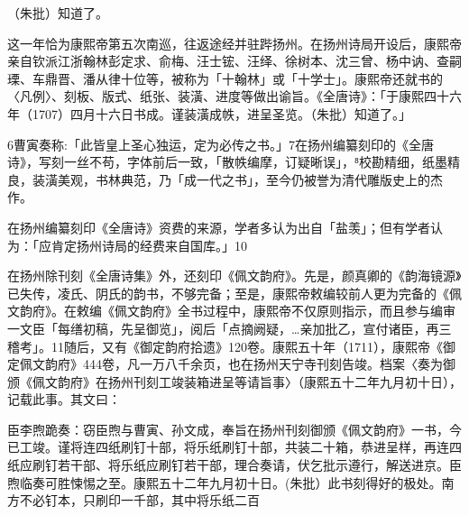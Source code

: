 \begin{BookQuote}
（朱批）知道了。
\end{BookQuote}

这一年恰为康熙帝第五次南巡，往返途经并驻跸扬州。在扬州诗局开设后，康熙帝亲自钦派江浙翰林彭定求、俞梅、汪士𬭎、汪绎、徐树本、沈三曾、杨中讷、查嗣瑮、车鼎晋、潘从律十位等，被称为「十翰林」或「十学士」。康熙帝还就书的〈凡例〉、刻板、版式、纸张、装潢、进度等做出谕旨。《全唐诗》：「于康熙四十六年（1707）四月十六日书成。谨装潢成帙，进呈圣览。（朱批）知道了。」

\vfill
\begin{BookNotes}
\end{BookNotes}

\noindent 6曹寅奏称:「此皆皇上圣心独运，定为必传之书。」7在扬州编纂刻印的《全唐诗》，写刻一丝不苟，字体前后一致，「散帙编摩，订疑晰误」，⁸校勘精细，纸墨精良，装潢美观，书林典范，乃「成一代之书」，至今仍被誉为清代雕版史上的杰作。

在扬州编纂刻印《全唐诗》资费的来源，学者多认为出自「盐羡」；但有学者认为：「应肯定扬州诗局的经费来自国库。」10

在扬州除刊刻《全唐诗集》外，还刻印《佩文韵府》。先是，颜真卿的《韵海镜源》已失传，凌氏、阴氏的韵书，不够完备；至是，康熙帝敕编较前人更为完备的《佩文韵府》。在敕编《佩文韵府》全书过程中，康熙帝不仅原则指示，而且参与编审一文臣「每缮初稿，先呈御览」，阅后「点摘阙疑，…亲加批乙，宣付诸臣，再三稽考」。11随后，又有《御定韵府拾遗》120卷。康熙五十年（1711），康熙帝《御定佩文韵府》444卷，凡一万八千余页，也在扬州天宁寺刊刻告竣。档案〈奏为御颁《佩文韵府》在扬州刊刻工竣装箱进呈等请旨事〉（康熙五十二年九月初十日），记载此事。其文曰：

\begin{BookQuote}
臣李煦跪奏：窃臣煦与曹寅、孙文成，奉旨在扬州刊刻御颁《佩文韵府》一书，今已工竣。谨将连四纸刷钉十部，将乐纸刷钉十部，共装二十箱，恭进呈样，再连四纸应刷钉若干部、将乐纸应刷钉若干部，理合奏请，伏乞批示遵行，解送进京。臣煦临奏可胜悚惕之至。康熙五十二年九月初十日。(朱批）此书刻得好的极处。南方不必钉本，只刷印一千部，其中将乐纸二百
\end{BookQuote}

